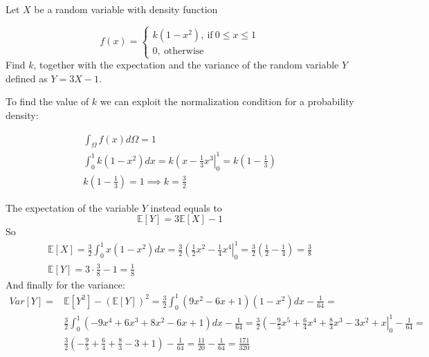 \begin{question}
Let $X$ be a random variable with density function

\begin{equation*}
	f(x) = 
	\begin{cases}
	k(1 - x^2),~\textrm{if}~0 \leq x \leq 1\\
	0,~\textrm{otherwise}		
	\end{cases}
\end{equation*}
Find $k$, together with the expectation and the variance of the random variable $Y$ defined as $Y = 3X - 1$.
\end{question}

\cprotEnv\begin{solution}
\label{ex:variance}
To find the value of $k$ we can exploit the normalization condition for a probability density:

\begin{equation*}
\begin{gathered}
\int_\Omega f(x) d\Omega = 1\\
\int_{0}^{1}k(1-x^{2})dx = k\left(x-\frac{1}{3}x^{3}\right|_{0}^{1}= k\left(1-\frac{1}{3}\right) \\
k\left(1-\frac{1}{3}\right) = 1 \implies k = \frac{3}{2}
	\end{gathered}
\end{equation*}

The expectation of the variable $Y$ instead equals to
\begin{equation*}
\mathbb{E}[Y] = 3\mathbb{E}[X] - 1
\end{equation*}	
So
\begin{equation*}
	\begin{gathered}
\mathbb{E}[X] = \frac{3}{2}\int_{0}^{1}x(1-x^2)dx = \frac{3}{2}\left(\frac{1}{2}x^2-\frac{1}{4}x^{4}\right|_{0}^{1} = \frac{3}{2}\left(\frac{1}{2}-\frac{1}{4}\right) = \frac{3}{8} \\
\mathbb{E}[Y] = 3\cdot\frac{3}{8} - 1 = \frac{1}{8} 
\end{gathered}
\end{equation*}
And finally for the variance:
\begin{equation*}
\begin{aligned}
Var[Y] = & \mathbb{E}[Y^2] - (\mathbb{E}[Y])^2 = \frac{3}{2}\int_{0}^{1}(9x^2 - 6x + 1)(1-x^2)dx - \frac{1}{64} = \\  &\frac{3}{2}\int_{0}^{1}(- 9x^4 + 6x^3 + 8x^2 - 6x + 1)dx - \frac{1}{64} = 
\frac{3}{2}\left(- \frac{9}{5}x^5 + \frac{6}{4}x^4 + \frac{8}{3}x^3 - 3x^2 + x\right|_{0}^{1} - \frac{1}{64} = \\
& \frac{3}{2}\left(- \frac{9}{5} + \frac{6}{4} + \frac{8}{3} - 3 + 1\right) - \frac{1}{64} = \frac{11}{20} - \frac{1}{64} = \frac{171}{320}
\end{aligned}
\end{equation*}


\end{solution}
